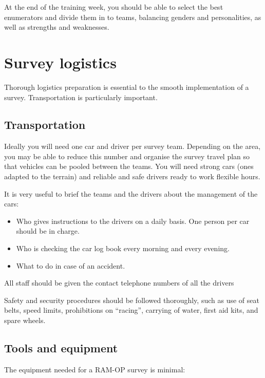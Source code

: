 \documentclass[12pt,a4paper]{book}
\providecommand{\tightlist}{%
  \setlength{\itemsep}{0pt}\setlength{\parskip}{0pt}}
\begin{document}
At the end of the training week, you should be able to select the best enumerators and divide them in to teams, balancing genders and personalities, as well as strengths and weaknesses.

\hypertarget{survey-logistics}{%
\section{Survey logistics}\label{survey-logistics}}

Thorough logistics preparation is essential to the smooth implementation of a survey. Transportation is particularly important.

\hypertarget{transportation}{%
\subsection{Transportation}\label{transportation}}

Ideally you will need one car and driver per survey team. Depending on the area, you may be able to reduce this number and organise the survey travel plan so that vehicles can be pooled between the teams. You will need strong cars (ones adapted to the terrain) and reliable and safe drivers ready to work flexible hours.

It is very useful to brief the teams and the drivers about the management of the cars:

\begin{itemize}
\tightlist
\item
  Who gives instructions to the drivers on a daily basis. One person per car should be in charge.
\item
  Who is checking the car log book every morning and every evening.
\item
  What to do in case of an accident.
\end{itemize}

All staff should be given the contact telephone numbers of all the drivers

Safety and security procedures should be followed thoroughly, such as use of seat belts, speed limits, prohibitions on ``racing'', carrying of water, first aid kits, and spare wheels.

\hypertarget{tools-and-equipment}{%
\subsection{Tools and equipment}\label{tools-and-equipment}}

The equipment needed for a RAM-OP survey is minimal:
\end{document}
